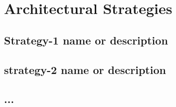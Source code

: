 \documentclass[conference]{IEEEtran}
\begin{document}
\section{Architectural Strategies}

\subsection{Strategy-1 name or description}

\subsection{strategy-2 name or description}

\subsection{...}
\end{document}
